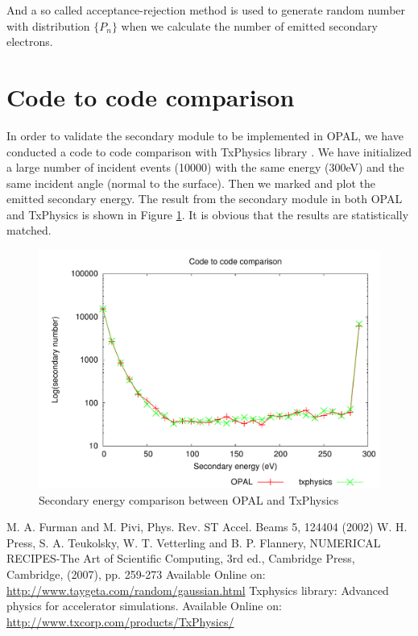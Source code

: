 \documentclass[a4paper,11pt]{article}
\begin{document}
And a so called acceptance-rejection method is used to generate random number with distribution $\{P_n\}$ when we calculate the number of emitted secondary electrons.
\section{Code to code comparison}
In order to validate the secondary module to be implemented in OPAL, we have conducted a code to code comparison with TxPhysics library \cite{TP}. We have initialized a large number of incident events (10000) with the same energy (300eV) and the same incident angle (normal to the surface). Then we marked and plot the emitted secondary energy. The result from the secondary module in both OPAL and TxPhysics is shown in Figure \ref{fig:cc}. It is obvious that the results are statistically matched. 

\begin{figure}[H]
\begin{center}
\includegraphics[width=1\textwidth]{code_comparison.pdf}
\end{center}
\caption{Secondary energy comparison between OPAL and TxPhysics\label{fig:cc}}
\end{figure}
\begin{thebibliography}{99}
  M. A. Furman and M. Pivi, Phys. Rev. ST Accel. Beams 5, 124404 (2002)
 W. H. Press, S. A. Teukolsky, W. T. Vetterling and B. P. Flannery, NUMERICAL RECIPES-The Art of Scientific Computing, 3rd ed., Cambridge Press, Cambridge, (2007), pp. 259-273
 Available Online on: \href{http://www.taygeta.com/random/gaussian.html}{http://www.taygeta.com/random/gaussian.html}
 Txphysics library: Advanced physics for accelerator simulations. Available Online on: \href{http://www.txcorp.com/products/TxPhysics/}{http://www.txcorp.com/products/TxPhysics/}
\end{thebibliography}
 
\end{document}
